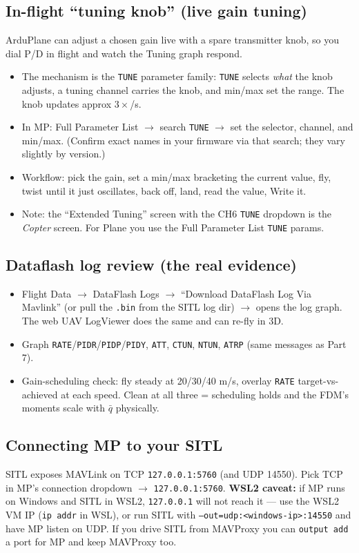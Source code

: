 \documentclass[11pt,a4paper]{article}
\newcommand{\pp}[1]{\texttt{#1}} %
\begin{document}
\subsection{In-flight ``tuning knob'' (live gain tuning)}
ArduPlane can adjust a chosen gain live with a spare transmitter knob, so you dial
P/D in flight and watch the Tuning graph respond.
\begin{itemize}[leftmargin=1.4em]
  \item The mechanism is the \pp{TUNE} parameter family: \pp{TUNE} selects
  \emph{what} the knob adjusts, a tuning channel carries the knob, and min/max set
  the range. The knob updates approx $3\times$/s.
  \item In MP: Full Parameter List $\rightarrow$ search \pp{TUNE} $\rightarrow$ set
  the selector, channel, and min/max. (Confirm exact names in your firmware via
  that search; they vary slightly by version.)
  \item Workflow: pick the gain, set a min/max bracketing the current value, fly,
  twist until it just oscillates, back off, land, read the value, Write it.
  \item Note: the ``Extended Tuning'' screen with the CH6 \pp{TUNE} dropdown is the
  \emph{Copter} screen. For Plane you use the Full Parameter List \pp{TUNE} params.
\end{itemize}

\subsection{Dataflash log review (the real evidence)}
\begin{itemize}[leftmargin=1.4em]
  \item Flight Data $\rightarrow$ DataFlash Logs $\rightarrow$ ``Download DataFlash
  Log Via Mavlink'' (or pull the \pp{.bin} from the SITL log dir) $\rightarrow$
  opens the log graph. The web UAV LogViewer does the same and can re-fly in 3D.
  \item Graph \pp{RATE}/\pp{PIDR}/\pp{PIDP}/\pp{PIDY}, \pp{ATT}, \pp{CTUN},
  \pp{NTUN}, \pp{ATRP} (same messages as Part 7).
  \item Gain-scheduling check: fly steady at 20/30/40 m/s, overlay \pp{RATE}
  target-vs-achieved at each speed. Clean at all three = scheduling holds and the
  FDM's moments scale with $\bar q$ physically.
\end{itemize}

\subsection{Connecting MP to your SITL}
SITL exposes MAVLink on TCP \pp{127.0.0.1:5760} (and UDP 14550). Pick TCP in MP's
connection dropdown $\rightarrow$ \pp{127.0.0.1:5760}. \textbf{WSL2 caveat:} if MP
runs on Windows and SITL in WSL2, \pp{127.0.0.1} will not reach it --- use the
WSL2 VM IP (\pp{ip addr} in WSL), or run SITL with
\pp{--out=udp:<windows-ip>:14550} and have MP listen on UDP. If you drive SITL from
MAVProxy you can \pp{output add} a port for MP and keep MAVProxy too.
\end{document}

